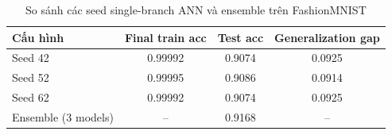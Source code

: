 \begin{table}[H]
\centering
\caption{So sánh các seed single-branch ANN và ensemble trên FashionMNIST}
\label{tab:fashion-mnist-seed-comparison}
\begin{tabular}{l c c c}
\toprule
Cấu hình & Final train acc & Test acc & Generalization gap \\
\midrule
Seed 42 & 0.99992 & 0.9074 & 0.0925 \\
Seed 52 & 0.99995 & 0.9086 & 0.0914 \\
Seed 62 & 0.99992 & 0.9074 & 0.0925 \\
Ensemble (3 models) & -- & 0.9168 & -- \\
\bottomrule
\end{tabular}
\end{table}
